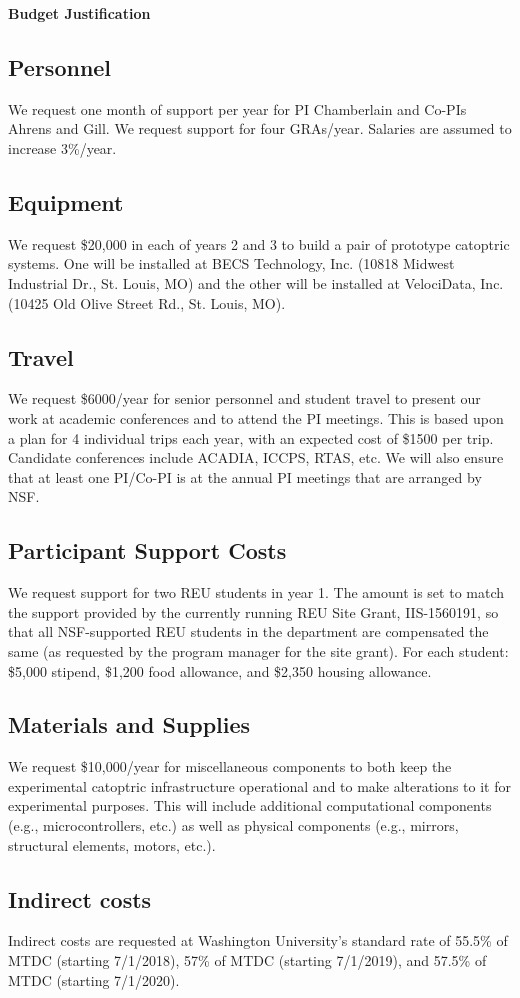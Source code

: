 \documentclass[11pt]{article}
\begin{document}
\pagestyle{empty}
\thispagestyle{empty}

\begin{center}
\textbf{\Large Budget Justification}
\end{center}

\subsection*{Personnel}
We request one month of support per year for PI Chamberlain and Co-PIs
Ahrens and Gill.
We request support for four GRAs/year. Salaries are 
assumed to increase 3\%/year. 

\subsection*{Equipment}
We request \$20,000 in each of years 2 and 3 to build a pair of
prototype catoptric systems.  One will be installed at
BECS Technology, Inc. (10818 Midwest Industrial Dr., St. Louis, MO)
and the other will be installed at VelociData, Inc. (10425 Old Olive
Street Rd., St. Louis, MO).

\subsection*{Travel}
We request \$6000/year for senior personnel and student travel
to present our work at academic 
conferences and to attend the PI meetings.
This is based upon a plan for 4 individual trips
each year, with an expected cost of \$1500 per trip.
Candidate conferences include ACADIA, ICCPS, RTAS, etc.
We will also ensure that at least one PI/Co-PI is
at the annual PI meetings that are arranged by NSF. 

\subsection*{Participant Support Costs}
We request support for two REU students in year 1. 
The amount is set to match the support provided by the currently
running REU Site Grant, IIS-1560191, so that all NSF-supported REU
students in the department are compensated the same (as requested by
the program manager for the site grant).
For each student: \$5,000 stipend, \$1,200 food allowance, and \$2,350
housing allowance.

\subsection*{Materials and Supplies}
We request \$10,000/year for
miscellaneous components to both keep the experimental catoptric
infrastructure operational and to make alterations to it for
experimental purposes. This will
include additional computational components (e.g., microcontrollers, etc.)
as well as physical components (e.g., mirrors, structural elements, motors,
etc.).

\subsection*{Indirect costs}
Indirect costs are requested at Washington University's standard rate of
55.5\% of MTDC (starting 7/1/2018), 57\% of MTDC (starting 7/1/2019), and
57.5\% of MTDC (starting 7/1/2020).
\end{document}

